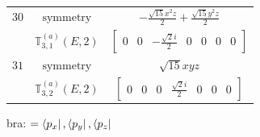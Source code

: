 \documentclass[fleqn,8pt,landscape]{jsarticle}
\begin{document}
\begin{longtable}{ccc}
$ 30 $ & $ \text{symmetry} $ & $ - \frac{\sqrt{15} x^{2} z}{2} + \frac{\sqrt{15} y^{2} z}{2} $ \\
$  $ & $ \mathbb{T}_{3,1}^{(a)}(E,2) $ & $ \begin{bmatrix} 0 & 0 & - \frac{\sqrt{2} i}{2} & 0 & 0 & 0 & 0 \end{bmatrix} $ \\ \hline
$ 31 $ & $ \text{symmetry} $ & $ \sqrt{15} x y z $ \\
$  $ & $ \mathbb{T}_{3,2}^{(a)}(E,2) $ & $ \begin{bmatrix} 0 & 0 & 0 & \frac{\sqrt{2} i}{2} & 0 & 0 & 0 \end{bmatrix} $ \\ \hline
\end{longtable}
bra: $=\bra{p_{x}}, \bra{p_{y}}, \bra{p_{z}}$
\end{document}
